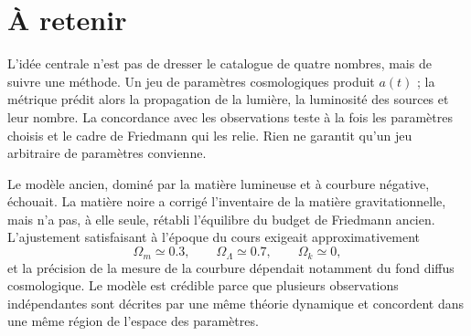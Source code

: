 \begin{classroomqa}
\end{classroomqa}

\begin{classroomqa}
\end{classroomqa}

\section{À retenir}

L’idée centrale n’est pas de dresser le catalogue de quatre nombres, mais de suivre une méthode. Un jeu de paramètres cosmologiques produit \(a(t)\) ; la métrique prédit alors la propagation de la lumière, la luminosité des sources et leur nombre. La concordance avec les observations teste à la fois les paramètres choisis et le cadre de Friedmann qui les relie. Rien ne garantit qu’un jeu arbitraire de paramètres convienne.

Le modèle ancien, dominé par la matière lumineuse et à courbure négative, échouait. La matière noire a corrigé l’inventaire de la matière gravitationnelle, mais n’a pas, à elle seule, rétabli l’équilibre du budget de Friedmann ancien. L’ajustement satisfaisant à l’époque du cours exigeait approximativement
\begin{equation}
\Omega_m\simeq0.3,
\qquad
\Omega_\Lambda\simeq0.7,
\qquad
\Omega_k\simeq0,
\end{equation}
et la précision de la mesure de la courbure dépendait notamment du fond diffus cosmologique. Le modèle est crédible parce que plusieurs observations indépendantes sont décrites par une même théorie dynamique et concordent dans une même région de l’espace des paramètres.
